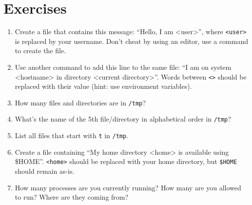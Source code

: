 \section{Exercises}

\begin{enumerate}
    \item Create a file that contains this message: ``Hello, I am <user>'',
        where \lstinline|<user>| is replaced by your username. Don't cheat by using
        an editor, use a command to create the file.
    \item Use another command to add this line to the same file: ``I am on system <hostname> in
        directory <current directory>''. Words between \lstinline|<>| should be replaced with
        their value (hint: use environment variables).
    \item How many files and directories are in \lstinline|/tmp|?
    \item What's the name of the 5th file/directory in alphabetical order in \lstinline|/tmp|?
    \item List all files that start with \lstinline|t| in \lstinline|/tmp|.
    \item Create a file containing ``My home directory <home> is available using \$HOME''.
        \lstinline|<home>| should be replaced with your home directory, but \lstinline|$HOME|
        should remain as-is.
    \item How many processes are you currently running? How many are you allowed
        to run? Where are they coming from?
\end{enumerate}
